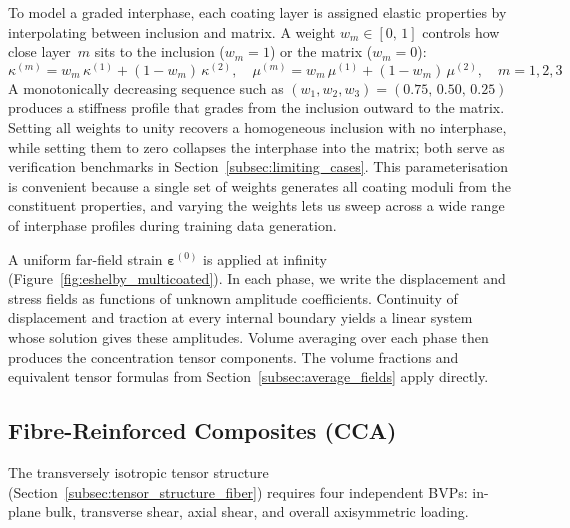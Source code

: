 \documentclass[oneside, 12pt, a4paper, bibliography=totoc]{book}
\newcommand{\bs}[1]{\bm{#1}}                       %
\begin{document}
To model a graded interphase, each coating layer is assigned elastic properties by interpolating between inclusion and matrix. A weight $w_m \in [0,\,1]$ controls how close layer~$m$ sits to the inclusion ($w_m = 1$) or the matrix ($w_m = 0$):
%
\begin{equation}
    \kappa^{(m)} = w_m \, \kappa^{(1)} + (1 - w_m) \, \kappa^{(2)}, \quad
    \mu^{(m)} = w_m \, \mu^{(1)} + (1 - w_m) \, \mu^{(2)}, \quad m = 1, 2, 3
    \label{eq:coating_interpolation}
\end{equation}
%
A monotonically decreasing sequence such as $(w_1, w_2, w_3) = (0.75,\, 0.50,\, 0.25)$ produces a stiffness profile that grades from the inclusion outward to the matrix. Setting all weights to unity recovers a homogeneous inclusion with no interphase, while setting them to zero collapses the interphase into the matrix; both serve as verification benchmarks in Section~\ref{subsec:limiting_cases}. This parameterisation is convenient because a single set of weights generates all coating moduli from the constituent properties, and varying the weights lets us sweep across a wide range of interphase profiles during training data generation.

A uniform far-field strain $\bs{\varepsilon}^{(0)}$ is applied at infinity (Figure~\ref{fig:eshelby_multicoated}). In each phase, we write the displacement and stress fields as functions of unknown amplitude coefficients. Continuity of displacement and traction at every internal boundary yields a linear system whose solution gives these amplitudes. Volume averaging over each phase then produces the concentration tensor components. The volume fractions and equivalent tensor formulas from Section~\ref{subsec:average_fields} apply directly.


\subsection{Fibre-Reinforced Composites (CCA)}
\label{subsec:fiber_bvp}

The transversely isotropic tensor structure (Section~\ref{subsec:tensor_structure_fiber}) requires four independent BVPs: in-plane bulk, transverse shear, axial shear, and overall axisymmetric loading.
\end{document}
